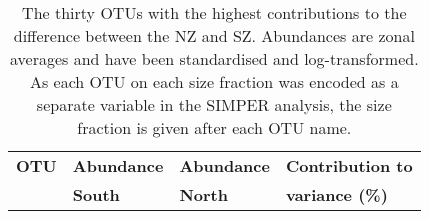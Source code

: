 \begin{landscape}
\begin{table}
\sffamily
\begin{center}
\caption[Highest-contributing \acp{OTU} to the difference between the North and South zones]{\sffamily{}
The thirty \acp{OTU} with the highest contributions to the difference between the \ac{NZ} and \ac{SZ}. 
  Abundances are zonal averages and have been standardised and log-transformed.
  As each \ac{OTU} on each size fraction was encoded as a separate variable in the \ac{SIMPER} analysis, the size fraction is given after each \ac{OTU} name.
  }
\label{tab:otussimper}
\begin{tabular}{llll}
\toprule
\textbf{OTU} & \textbf{Abundance} & \textbf{Abundance} & \textbf{Contribution to}\\
& \textbf{South} & \textbf{North} & \textbf{variance (\%)}\\


\end{tabular}
\end{center}
\end{table}
\end{landscape}

